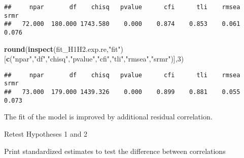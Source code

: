 \documentclass[
]{article}
\newenvironment{Shaded}{\begin{snugshade}}{\end{snugshade}}
\newcommand{\DecValTok}[1]{\textcolor[rgb]{0.00,0.00,0.81}{#1}}
\newcommand{\KeywordTok}[1]{\textcolor[rgb]{0.13,0.29,0.53}{\textbf{#1}}}
\newcommand{\NormalTok}[1]{#1}
\newcommand{\OperatorTok}[1]{\textcolor[rgb]{0.81,0.36,0.00}{\textbf{#1}}}
\newcommand{\StringTok}[1]{\textcolor[rgb]{0.31,0.60,0.02}{#1}}
\begin{document}
\begin{verbatim}
##     npar       df    chisq   pvalue      cfi      tli    rmsea     srmr 
##   72.000  180.000 1743.580    0.000    0.874    0.853    0.061    0.076
\end{verbatim}

\begin{Shaded}
\begin{Highlighting}[]
\KeywordTok{round}\NormalTok{(}\KeywordTok{inspect}\NormalTok{(fit_H1H2.exp.re,}\StringTok{"fit"}\NormalTok{)}
\NormalTok{      [}\KeywordTok{c}\NormalTok{(}\StringTok{"npar"}\NormalTok{,}\StringTok{"df"}\NormalTok{,}\StringTok{"chisq"}\NormalTok{,}\StringTok{"pvalue"}\NormalTok{,}\StringTok{"cfi"}\NormalTok{,}\StringTok{"tli"}\NormalTok{,}\StringTok{"rmsea"}\NormalTok{,}\StringTok{"srmr"}\NormalTok{)],}\DecValTok{3}\NormalTok{)}
\end{Highlighting}
\end{Shaded}

\begin{verbatim}
##     npar       df    chisq   pvalue      cfi      tli    rmsea     srmr 
##   73.000  179.000 1439.326    0.000    0.899    0.881    0.055    0.073
\end{verbatim}

The fit of the model is improved by additional residual correlation.

Retest Hypotheses 1 and 2

Print standardized estimates to test the difference between correlations

\begin{Shaded}
\end{Shaded}
\end{document}
